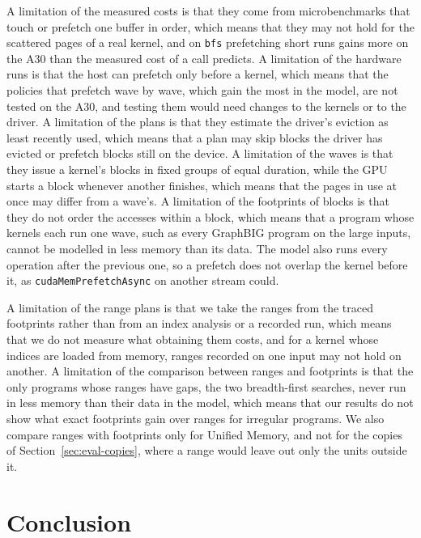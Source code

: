 \documentclass[11pt]{article}
\newcommand{\secref}[1]{Section~\ref{#1}}
\newcommand{\code}[1]{\texttt{#1}}
\begin{document}
A limitation of the measured costs is that they come from microbenchmarks that touch or prefetch one buffer in
order, which means that they may not hold for the scattered pages of a real kernel, and on \code{bfs} prefetching short
runs gains more on the A30 than the measured cost of a call predicts. A limitation of the hardware runs is that the host can
prefetch only before a kernel, which means that the policies that prefetch wave by wave, which gain the most in the
model, are not tested on the A30, and testing them would need changes to the kernels or to the driver. A limitation
of the plans is that they estimate the driver's eviction as least recently used, which means that a plan may skip
blocks the driver has evicted or prefetch blocks still on the device. A limitation of the waves is that they issue a kernel's blocks in fixed groups
of equal duration, while the GPU starts a block whenever another finishes, which means that the pages in use at
once may differ from a wave's. A limitation of the footprints of blocks is that they do not order the accesses
within a block, which means that a program whose kernels each run one wave, such as every GraphBIG program on the
large inputs, cannot be modelled in less memory than its data. The model also runs every operation after the
previous one, so a prefetch does not overlap the kernel before it, as \code{cudaMemPrefetchAsync} on another stream
could.

A limitation of the range plans is that we take the ranges from the traced footprints rather than from an index
analysis or a recorded run, which means that we do not measure what obtaining them costs, and for a kernel whose
indices are loaded from memory, ranges recorded on one input may not hold on another. A limitation of the
comparison between ranges and footprints is that the only programs whose ranges have gaps, the two breadth-first
searches, never run in less memory than their data in the model, which means that our results do not show what
exact footprints gain over ranges for irregular programs. We also compare ranges with footprints only for Unified
Memory, and not for the copies of \secref{sec:eval-copies}, where a range would leave out only the units outside it.

\section{Conclusion}
\label{sec:conclusion}
\end{document}
